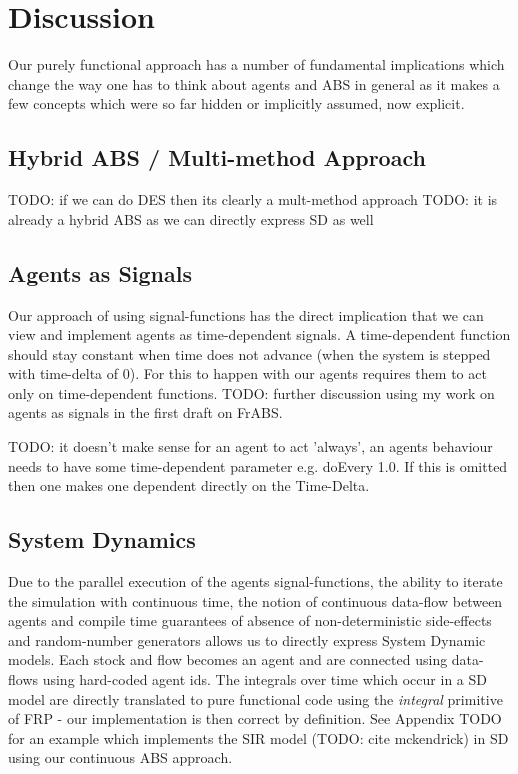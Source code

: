 \section{Discussion}
Our purely functional approach has a number of fundamental implications which change the way one has to think about agents and ABS in general as it makes a few concepts which were so far hidden or implicitly assumed, now explicit. 

\subsection{Hybrid ABS / Multi-method Approach}
TODO: if we can do DES then its clearly a mult-method approach
TODO: it is already a hybrid ABS as we can directly express SD as well

\subsection{Agents as Signals}
Our approach of using signal-functions has the direct implication that we can view and implement agents as time-dependent signals. A time-dependent function should stay constant when time does not advance (when the system is stepped with time-delta of 0). For this to happen with our agents requires them to act only on time-dependent functions. TODO: further discussion using my work on agents as signals in the first draft on FrABS.

TODO: it doesn't make sense for an agent to act 'always', an agents behaviour needs to have some time-dependent parameter e.g. doEvery 1.0. If this is omitted then one makes one dependent directly on the Time-Delta.

\subsection{System Dynamics}
Due to the parallel execution of the agents signal-functions, the ability to iterate the simulation with continuous time, the notion of continuous data-flow between agents and compile time guarantees of absence of non-deterministic side-effects and random-number generators allows us to directly express System Dynamic models.
Each stock and flow becomes an agent and are connected using data-flows using hard-coded agent ids. The integrals over time which occur in a SD model are directly translated to pure functional code using the \textit{integral} primitive of FRP - our implementation is then correct by definition.
See Appendix TODO for an example which implements the SIR model (TODO: cite mckendrick) in SD using our continuous ABS approach.

